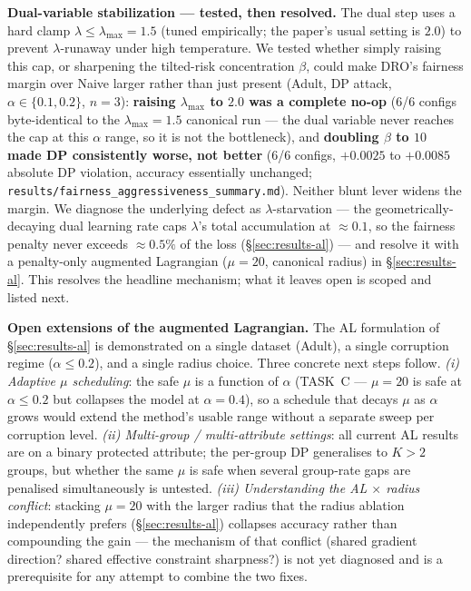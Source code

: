 \textbf{Dual-variable stabilization --- tested, then resolved.} The
dual step uses a hard clamp $\lambda\le\lambda_{\max}{=}1.5$ (tuned
empirically; the paper's usual setting is $2.0$) to prevent
$\lambda$-runaway under high temperature. We tested whether simply
raising this cap, or sharpening the tilted-risk concentration $\beta$,
could make DRO's fairness margin over Naive larger rather than just
present (Adult, DP attack, $\alpha\in\{0.1,0.2\}$, $n{=}3$):
\textbf{raising $\lambda_{\max}$ to $2.0$ was a complete no-op} (6/6
configs byte-identical to the $\lambda_{\max}{=}1.5$ canonical run ---
the dual variable never reaches the cap at this $\alpha$ range, so it is
not the bottleneck), and \textbf{doubling $\beta$ to $10$ made DP
consistently worse, not better} (6/6 configs, $+0.0025$ to $+0.0085$
absolute DP violation, accuracy essentially unchanged;
\texttt{results/fairness\_aggressiveness\_summary.md}).  Neither blunt
lever widens the margin.  We diagnose the underlying defect as
$\lambda$-starvation --- the geometrically-decaying dual learning rate
caps $\lambda$'s total accumulation at $\approx0.1$, so the fairness
penalty never exceeds $\approx0.5\%$ of the loss
(\S\ref{sec:results-al}) --- and resolve it with a penalty-only
augmented Lagrangian ($\mu{=}20$, canonical radius) in
\S\ref{sec:results-al}.  This resolves the headline mechanism; what it
leaves open is scoped and listed next.

\textbf{Open extensions of the augmented Lagrangian.}
The AL formulation of \S\ref{sec:results-al} is demonstrated on a single
dataset (Adult), a single corruption regime ($\alpha\le0.2$), and a
single radius choice.  Three concrete next steps follow.  \emph{(i)
Adaptive $\mu$ scheduling}: the safe $\mu$ is a function of $\alpha$
(TASK~C --- $\mu{=}20$ is safe at $\alpha\le0.2$ but collapses the
model at $\alpha{=}0.4$), so a schedule that decays $\mu$ as $\alpha$
grows would extend the method's usable range without a separate sweep
per corruption level.  \emph{(ii) Multi-group / multi-attribute
settings}: all current AL results are on a binary protected attribute;
the per-group DP generalises to $K{>}2$ groups, but whether the same
$\mu$ is safe when several group-rate gaps are penalised simultaneously
is untested.  \emph{(iii) Understanding the AL $\times$ radius
conflict}: stacking $\mu{=}20$ with the larger radius that the radius
ablation independently prefers (\S\ref{sec:results-al}) collapses
accuracy rather than compounding the gain --- the mechanism of that
conflict (shared gradient direction? shared effective constraint
sharpness?) is not yet diagnosed and is a prerequisite for any attempt
to combine the two fixes.
